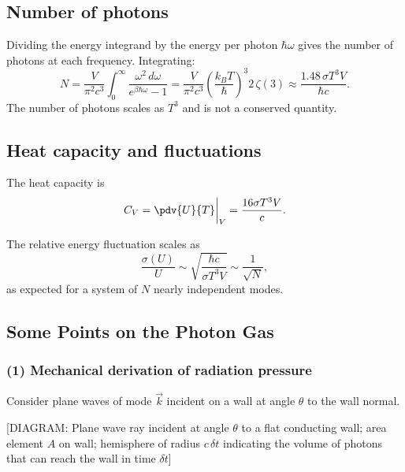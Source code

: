 \subsection{Number of photons}

Dividing the energy integrand by the energy per photon $\hbar\omega$ gives the
number of photons at each frequency.  Integrating:
\begin{equation}
    N = \frac{V}{\pi^2 c^3}\int_0^\infty \frac{\omega^2\,d\omega}{e^{\beta\hbar\omega}-1}
    = \frac{V}{\pi^2 c^3}\!\left(\frac{k_BT}{\hbar}\right)^{\!3} 2\,\zeta(3)
    \approx \frac{1.48\,\sigma T^3 V}{\hbar c}.
\end{equation}
The number of photons scales as $T^3$ and is not a conserved quantity.

\subsection{Heat capacity and fluctuations}

The heat capacity is
\begin{equation}
    C_V = \pdv{U}{T}\bigg|_V = \frac{16\sigma T^3 V}{c}.
\end{equation}

The relative energy fluctuation scales as
\begin{equation}
    \frac{\sigma(U)}{U} \sim \sqrt{\frac{\hbar c}{\sigma T^3 V}} \sim \frac{1}{\sqrt{N}},
\end{equation}
as expected for a system of $N$ nearly independent modes.

\subsection{Some Points on the Photon Gas}

\subsubsection*{(1) Mechanical derivation of radiation pressure}

Consider plane waves of mode $\vec{k}$ incident on a wall at angle $\theta$ to
the wall normal.

\begin{center}
[DIAGRAM: Plane wave ray incident at angle $\theta$ to a flat conducting wall;
area element $A$ on wall; hemisphere of radius $c\,\delta t$ indicating the
volume of photons that can reach the wall in time $\delta t$]
\end{center}


